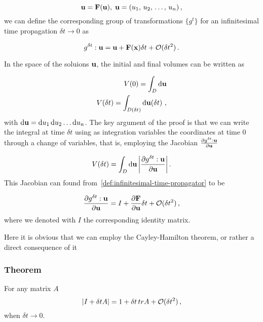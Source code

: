 \documentclass[12pt, class=report, crop=false]{standalone}
\begin{document}
\begin{equation}
  \vb{u} = \vb{F} (\vb{u}),\; \vb{u} = (u_1,\,u_2,\,\dots,\,u_n)\,,
\end{equation}
we can define the corresponding group of transformations \(\{g^t\}\) for an infinitesimal time propagation \(\delta t \rightarrow 0\) as

\begin{equation}
  \label{def:infinitesimal-time-propagator}
  g^{\delta t} : \vb{u} = \vb{u} + \vb{F}(\vb{x}) \delta t + \mathcal{O}(\delta t^2)\,.
\end{equation}

In the space of the soluions \(\vb{u}\), the initial and final volumes can be written as

\begin{subequations}
  \begin{align}
    V(0) = \int_{D} \dd{\vb{u}}\\
    V(\delta t) = \int_{D(\delta t)} \dd{\vb{u}(\delta t)} \,,
  \end{align}
\end{subequations}
with \(\dd{\vb{u}} = \dd{u_1}\dd{u_2}\dots\dd{u_n}\). The key argument of the proof is that we can write the integral at time \(\delta t\) using as integration variables the coordinates at time 0 through a change of variables, that is, employing the Jacobian \(\pdv{g^{\delta t}:\vb{u}}{\vb{u}}\)

\begin{equation}
\label{eq:volume-at-t}
  V(\delta t) = \int_{D} \dd{\vb{u}} \abs{\pdv{g^{\delta t}:\vb{u}}{\vb{u}}} \,.
\end{equation}
This Jacobian can found from~\cref{def:infinitesimal-time-propagator} to be

\begin{equation}
  \pdv{g^{\delta t}:\vb{u}}{\vb{u}} = I + \pdv{\vb{F}}{\vb{u}} \delta t + \mathcal{O}(\delta t^2)\,,
\end{equation}
where we denoted with \(I\) the corresponding identity matrix.

Here it is obvious that we can employ the Cayley-Hamilton theorem, or rather a direct consequence of it

\subsubsection{Theorem}
For any matrix \(A\)
\begin{equation}
  \abs{I+\delta t A} = 1 + \delta t\, tr A +\mathcal{O}(\delta t^2)\,,
\end{equation}
when \(\delta t \rightarrow 0\).
\newline
\end{document}
